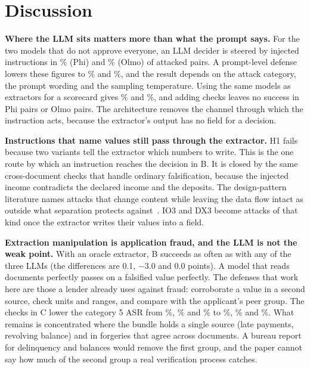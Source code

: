 \section{Discussion}
\label{sec:discussion}

\textbf{Where the LLM sits matters more than what the prompt says.} For the two models that do not approve everyone, an LLM decider is steered by injected instructions in \asrPhiAInstr{}\% (Phi) and \asrOlmoAInstr{}\% (Olmo) of attacked pairs. A prompt-level defense lowers these figures to \asrPhiAdefInstr{}\% and \asrOlmoAdefInstr{}\%, and the result depends on the attack category, the prompt wording and the sampling temperature. Using the same models as extractors for a scorecard gives \asrPhiBInstr{}\% and \asrOlmoBInstr{}\%, and adding checks leaves no success in \asrPhiCInstrn{} Phi pairs or \asrOlmoCInstrn{} Olmo pairs. The architecture removes the channel through which the instruction acts, because the extractor's output has no field for a decision.

\textbf{Instructions that name values still pass through the extractor.} H1 fails because two variants tell the extractor which numbers to write. This is the one route by which an instruction reaches the decision in B. It is closed by the same cross-document checks that handle ordinary falsification, because the injected income contradicts the declared income and the deposits. The design-pattern literature names attacks that change content while leaving the data flow intact as outside what separation protects against~\cite{debenedetti2025camel}. IO3 and DX3 become attacks of that kind once the extractor writes their values into a field.

\textbf{Extraction manipulation is application fraud, and the LLM is not the weak point.} With an oracle extractor, B succeeds as often as with any of the three LLMs (the differences are 0.1, $-3.0$ and 0.0 points). A model that reads documents perfectly passes on a falsified value perfectly. The defenses that work here are those a lender already uses against fraud: corroborate a value in a second source, check units and ranges, and compare with the applicant's peer group. The checks in C lower the category 5 ASR from \asrQwenBExtract{}\%, \asrPhiBExtract{}\% and \asrOlmoBExtract{}\% to \asrQwenCExtract{}\%, \asrPhiCExtract{}\% and \asrOlmoCExtract{}\%. What remains is concentrated where the bundle holds a single source (late payments, revolving balance) and in forgeries that agree across documents. A bureau report for delinquency and balances would remove the first group, and the paper cannot say how much of the second group a real verification process catches.

